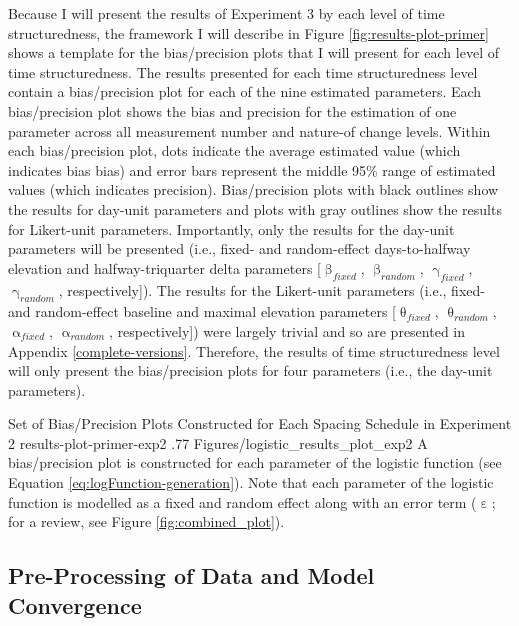 \documentclass[
12pt, %
twoside,
english]{guelphthesis}
\begin{document}
Because I will present the results of Experiment 3 by each level of time structuredness, the framework I will describe in Figure \ref{fig:results-plot-primer} shows a template for the bias/precision plots that I will present for each level of time structuredness. The results presented for each time structuredness level contain a bias/precision plot for each of the nine estimated parameters. Each bias/precision plot shows the bias and precision for the estimation of one parameter across all measurement number and nature-of change levels. Within each bias/precision plot, dots indicate the average estimated value (which indicates bias bias) and error bars represent the middle 95\% range of estimated values (which indicates precision). Bias/precision plots with black outlines show the results for day-unit parameters and plots with gray outlines show the results for Likert-unit parameters. Importantly, only the results for the day-unit parameters will be presented (i.e., fixed- and random-effect days-to-halfway elevation and halfway-triquarter delta parameters {[}\(\upbeta_{fixed}\), \(\upbeta_{random}\), \(\upgamma_{fixed}\), \(\upgamma_{random}\), respectively{]}). The results for the Likert-unit parameters (i.e., fixed- and random-effect baseline and maximal elevation parameters {[}\(\uptheta_{fixed}\), \(\uptheta_{random}\), \(\upalpha_{fixed}\), \(\upalpha_{random}\), respectively{]}) were largely trivial and so are presented in Appendix \ref{complete-versions}. Therefore, the results of time structuredness level will only present the bias/precision plots for four parameters (i.e., the day-unit parameters).
\begin{apaFigure}
[portrait]
[samepage]
[-0.2cm]
{Set of Bias/Precision Plots Constructed for Each Spacing Schedule in Experiment 2}
{results-plot-primer-exp2}
{.77}
{Figures/logistic_results_plot_exp2}
{A bias/precision plot is constructed for each parameter of the logistic function (see Equation \ref{eq:logFunction-generation}). Note that each parameter of the logistic function is modelled as a fixed and random effect along with an error term ($\upepsilon$; for a review, see Figure \ref{fig:combined_plot}).}
\end{apaFigure}
\hypertarget{pre-processing-of-data-and-model-convergence-2}{%
\subsection{Pre-Processing of Data and Model Convergence}\label{pre-processing-of-data-and-model-convergence-2}}
\end{document}
